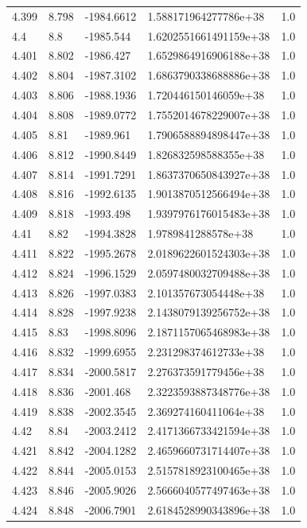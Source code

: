 \begin{tabular}{lllll}
4.399 & 8.798 & -1984.6612 & 1.588171964277786e+38 & 1.0 \\
4.4 & 8.8 & -1985.544 & 1.6202551661491159e+38 & 1.0 \\
4.401 & 8.802 & -1986.427 & 1.6529864916906188e+38 & 1.0 \\
4.402 & 8.804 & -1987.3102 & 1.6863790338688886e+38 & 1.0 \\
4.403 & 8.806 & -1988.1936 & 1.720446150146059e+38 & 1.0 \\
4.404 & 8.808 & -1989.0772 & 1.7552014678229007e+38 & 1.0 \\
4.405 & 8.81 & -1989.961 & 1.7906588894898447e+38 & 1.0 \\
4.406 & 8.812 & -1990.8449 & 1.826832598588355e+38 & 1.0 \\
4.407 & 8.814 & -1991.7291 & 1.8637370650843927e+38 & 1.0 \\
4.408 & 8.816 & -1992.6135 & 1.9013870512566494e+38 & 1.0 \\
4.409 & 8.818 & -1993.498 & 1.9397976176015483e+38 & 1.0 \\
4.41 & 8.82 & -1994.3828 & 1.9789841288578e+38 & 1.0 \\
4.411 & 8.822 & -1995.2678 & 2.0189622601524303e+38 & 1.0 \\
4.412 & 8.824 & -1996.1529 & 2.0597480032709488e+38 & 1.0 \\
4.413 & 8.826 & -1997.0383 & 2.101357673054448e+38 & 1.0 \\
4.414 & 8.828 & -1997.9238 & 2.1438079139256752e+38 & 1.0 \\
4.415 & 8.83 & -1998.8096 & 2.1871157065468983e+38 & 1.0 \\
4.416 & 8.832 & -1999.6955 & 2.231298374612733e+38 & 1.0 \\
4.417 & 8.834 & -2000.5817 & 2.276373591779456e+38 & 1.0 \\
4.418 & 8.836 & -2001.468 & 2.3223593887348776e+38 & 1.0 \\
4.419 & 8.838 & -2002.3545 & 2.369274160411064e+38 & 1.0 \\
4.42 & 8.84 & -2003.2412 & 2.4171366733421594e+38 & 1.0 \\
4.421 & 8.842 & -2004.1282 & 2.4659660731714407e+38 & 1.0 \\
4.422 & 8.844 & -2005.0153 & 2.5157818923100465e+38 & 1.0 \\
4.423 & 8.846 & -2005.9026 & 2.5666040577497463e+38 & 1.0 \\
4.424 & 8.848 & -2006.7901 & 2.6184528990343896e+38 & 1.0 \\

\end{tabular}
